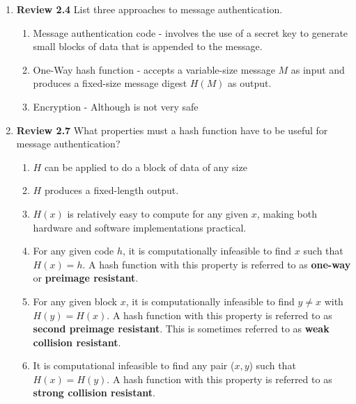 \documentclass[12pt]{article}
\begin{document}
\renewcommand{\headrulewidth}{0.4pt}

\vspace{-3mm}

\begin{enumerate}

	\item {\textbf{Review 2.4} List three approaches to message authentication. } 
	
	\begin{enumerate}
 	 \item Message authentication code - involves the use of a secret key to generate small blocks of data that is appended to the message. 
	 \item One-Way hash function - accepts a variable-size message $M$ as input and produces a fixed-size message digest $H(M)$ as output. 
 	 \item Encryption - Although is not very safe
	\end{enumerate}
		
	\vspace{10pt}
	
	\item {\textbf{Review 2.7} What properties must a hash function have to be useful for message authentication? }
	
	\begin{enumerate}
 	 \item $H$ can be applied to do a block of data of any size 
	 \item $H$ produces a fixed-length output. 
 	 \item $H(x)$ is relatively easy to compute for any given $x$, making both hardware and software implementations practical.  
	 \item For any given code $h$, it is computationally infeasible to find $x$ such that $H(x) = h$. A hash function with this property is referred to as \textbf{one-way} or \textbf{preimage resistant}.
	 \item For any given block $x$, it is computationally infeasible to find $y\neq x$ with $H(y) = H(x)$. A hash function with this property is referred to as \textbf{second preimage resistant}. This is sometimes referred to as \textbf{weak collision resistant}. 
	 \item It is computational infeasible to find any pair ($x,y$) such that $H(x) = H(y)$. A hash function with this property is referred to as \textbf{strong collision resistant}.
	\end{enumerate}
		

\end{enumerate}
\end{document}
